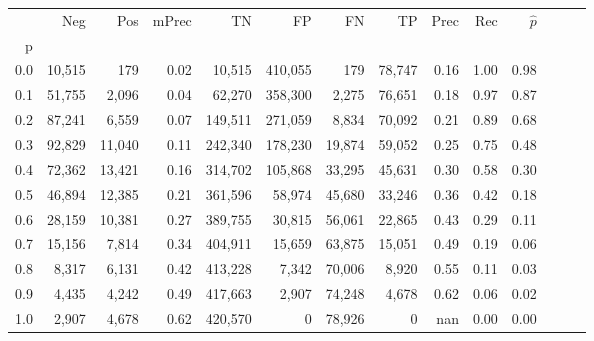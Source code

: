 \begin{tabular}{rrrrrrrrrrrrrr}
\toprule
{} &     Neg &     Pos & mPrec &       TN &       FP &      FN &      TP &  Prec &   Rec & $\hat{p}$ \\
p   &         &         &       &          &          &         &         &       &       &           \\
\midrule
0.0 &  10,515 &     179 &  0.02 &   10,515 &  410,055 &     179 &  78,747 &  0.16 &  1.00 &      0.98 \\
0.1 &  51,755 &   2,096 &  0.04 &   62,270 &  358,300 &   2,275 &  76,651 &  0.18 &  0.97 &      0.87 \\
0.2 &  87,241 &   6,559 &  0.07 &  149,511 &  271,059 &   8,834 &  70,092 &  0.21 &  0.89 &      0.68 \\
0.3 &  92,829 &  11,040 &  0.11 &  242,340 &  178,230 &  19,874 &  59,052 &  0.25 &  0.75 &      0.48 \\
0.4 &  72,362 &  13,421 &  0.16 &  314,702 &  105,868 &  33,295 &  45,631 &  0.30 &  0.58 &      0.30 \\
0.5 &  46,894 &  12,385 &  0.21 &  361,596 &   58,974 &  45,680 &  33,246 &  0.36 &  0.42 &      0.18 \\
0.6 &  28,159 &  10,381 &  0.27 &  389,755 &   30,815 &  56,061 &  22,865 &  0.43 &  0.29 &      0.11 \\
0.7 &  15,156 &   7,814 &  0.34 &  404,911 &   15,659 &  63,875 &  15,051 &  0.49 &  0.19 &      0.06 \\
0.8 &   8,317 &   6,131 &  0.42 &  413,228 &    7,342 &  70,006 &   8,920 &  0.55 &  0.11 &      0.03 \\
0.9 &   4,435 &   4,242 &  0.49 &  417,663 &    2,907 &  74,248 &   4,678 &  0.62 &  0.06 &      0.02 \\
1.0 &   2,907 &   4,678 &  0.62 &  420,570 &        0 &  78,926 &       0 &   nan &  0.00 &      0.00 \\
\bottomrule
\end{tabular}
